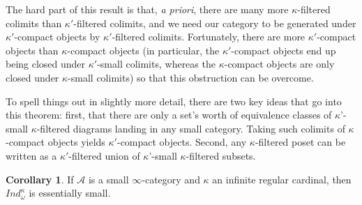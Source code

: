 \documentclass[letterpaper]{article}
\theoremstyle{definition}
\newtheorem{corollary}[lemma]{Corollary}
\newcommand{\mc}{\mathcal}
\begin{document}
The hard part of this result is that, \textit{a priori}, there are
many more $\kappa$-filtered colimits than $\kappa'$-filtered colimits,
and we need our category to be generated under $\kappa'$-compact
objects by $\kappa'$-filtered colimits. Fortunately, there are more
$\kappa'$-compact objects than $\kappa$-compact objects (in
particular, the $\kappa'$-compact objects end up being closed under
$\kappa'$-small colimits, whereas the $\kappa$-compact objects are
only closed under $\kappa$-small colimits) so that this
obstruction can be overcome.

To spell things out in slightly more detail, there are two key ideas that go into this theorem: first, that there are only
a set's worth of equivalence classes of $\kappa$'-small $\kappa$-filtered diagrams landing in
any small category. Taking such colimits of $\kappa$-compact objects
yields $\kappa'$-compact objects. Second, any $\kappa$-filtered poset can be
written as a $\kappa'$-filtered union of $\kappa$'-small
$\kappa$-filtered subsets.

\begin{corollary}
If $\mc A$ is a small $\infty$-category and $\kappa$ an infinite
regular cardinal, then $Ind_{\omega}^{\kappa}$ is essentially small.
\end{corollary}
\end{document}
